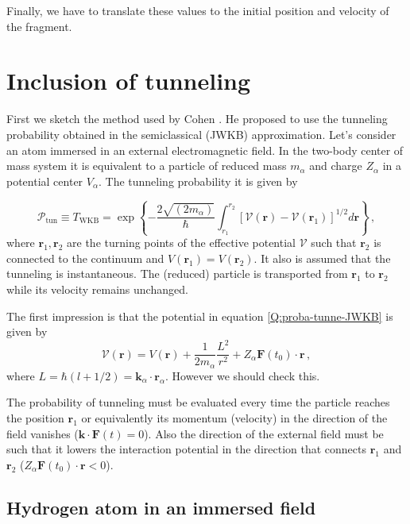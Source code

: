Finally, we have to translate these values to the initial position and
velocity of the fragment.

\section{Inclusion of tunneling}
\label{S:Inclu-tunne}

First we sketch the method used by Cohen \autocite{Cohen2001PRAp043412}. He proposed
to use the tunneling probability obtained in the semiclassical (JWKB)
approximation. Let's consider an atom immersed in an external
electromagnetic field. In the two-body center of mass system it is
equivalent to a particle of reduced mass $m_{\alpha}$ and charge
$Z_{\alpha}$ in a potential center $V_{\alpha}$. The tunneling
probability it is given by \cite{Galindo1990_QMvII}

\begin{equation}\label{Q:proba-tunne-JWKB}
\mathcal{P}_{\mathrm{tun}} \equiv T_{\mathrm{WKB}} = \exp{\left\{ -
\frac{2 \sqrt{(2 m_{\alpha})}}{\hbar} \int_{r_{1}}^{r_{2}} \left[
\mathcal{V}(\bm{r}) - \mathcal{V}(\bm{r}_{1})\right]^{1/2} d \bm{r}
\right\}} \, ,
\end{equation}
%
where $\bm{r}_{1}, \bm{r}_{2}$ are the turning points of the effective
potential $\mathcal{V}$ such that $\bm{r}_{2}$ is connected to the
continuum and $V(\bm{r}_{1})=V(\bm{r}_{2})$. It also is assumed that
the tunneling is instantaneous. The (reduced) particle is transported
from $\bm{r}_{1}$ to $\bm{r}_{2}$ while its velocity remains unchanged.

The first impression is that the potential in equation
\ref{Q:proba-tunne-JWKB} is given by
%
\begin{equation}\label{Q:effec-poten-JWKB}
\mathcal{V}(\bm{r}) = V(\bm{r}) + \frac{1}{2 m_{\alpha}}
\frac{L^{2}}{r^{2}} + Z_{\alpha} \bm{F}(t_{0})  \cdot \bm{r} \, ,
\end{equation}
%
where $L=\hbar (l+1/2) = \bm{k}_{\alpha} \cdot \bm{r}_{\alpha}$.
However we should check this.

The probability of tunneling must be evaluated every time the particle
reaches the position $\bm{r}_{1}$ or equivalently its momentum
(velocity) in the direction of the field vanishes ($\bm{k} \cdot
\bm{F}(t) =0$). Also the direction of the external field must be such
that it lowers the interaction potential in the direction that connects
$\bm{r}_{1}$ and $\bm{r}_{2}$ ($Z_{\alpha} \bm{F}(t_{0})  \cdot \bm{r}
< 0$).

\subsection{Hydrogen atom in an immersed field}
\label{S:Hydro-atom-immer-field}

